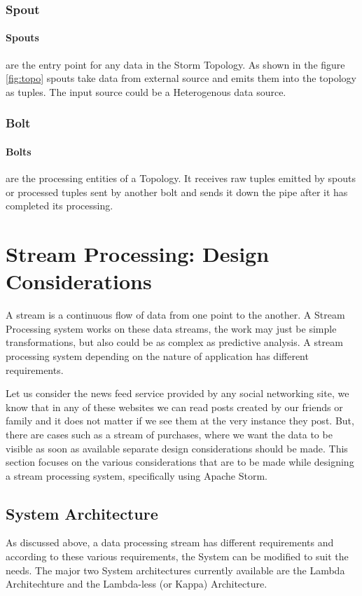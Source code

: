 \documentclass[runningheads,a4paper]{llncs}[2015/06/24]
\begin{document}
\subsubsection{Spout} 
\paragraph{Spouts} are the entry point for any data in the Storm Topology. As shown in the figure \ref{fig:topo} spouts take data from external source and emits them into the topology as tuples. The input source could be a Heterogenous data source.

\subsubsection{Bolt} 
\paragraph{Bolts} are the processing entities of a Topology. It receives raw tuples emitted by spouts or processed tuples sent by another bolt and sends it down the pipe after it has completed its processing.

\section{Stream Processing: Design Considerations}
A stream is a continuous flow of data from one point to the another. A Stream Processing system works on these data streams, the work may just be simple transformations, but also could be as complex as predictive analysis. A stream processing system depending on the nature of application has different requirements. 

Let us consider the news feed service provided by any social networking site, we know that in any of these websites we can read posts created by our friends or family and it does not matter if we see them at the very instance they post. But, there are cases such as a stream of purchases, where we want the data to be visible as soon as available separate design considerations should be made. This section focuses on the various considerations that are to be made while designing a stream processing system, specifically using Apache Storm.

\subsection{System Architecture}
As discussed above, a data processing stream has different requirements and according to these various requirements, the System can be modified to suit the needs. The major two System architectures currently available are the Lambda Architechture and the Lambda-less (or Kappa) Architecture.
\end{document}
